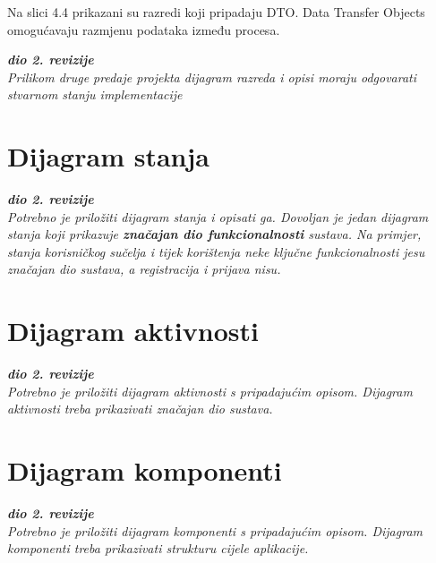 Na slici 4.4 prikazani su razredi koji pripadaju DTO. Data Transfer Objects omogućavaju
razmjenu podataka između procesa.


\textbf{\textit{dio 2. revizije}}\\

\textit{Prilikom druge predaje projekta dijagram razreda i opisi moraju odgovarati stvarnom stanju implementacije}



\eject

\section{Dijagram stanja}


\textbf{\textit{dio 2. revizije}}\\

\textit{Potrebno je priložiti dijagram stanja i opisati ga. Dovoljan je jedan dijagram stanja koji prikazuje \textbf{značajan dio funkcionalnosti} sustava. Na primjer, stanja korisničkog sučelja i tijek korištenja neke ključne funkcionalnosti jesu značajan dio sustava, a registracija i prijava nisu. }


\eject

\section{Dijagram aktivnosti}

\textbf{\textit{dio 2. revizije}}\\

\textit{Potrebno je priložiti dijagram aktivnosti s pripadajućim opisom. Dijagram aktivnosti treba prikazivati značajan dio sustava.}

\eject
\section{Dijagram komponenti}

\textbf{\textit{dio 2. revizije}}\\

\textit{Potrebno je priložiti dijagram komponenti s pripadajućim opisom. Dijagram komponenti treba prikazivati strukturu cijele aplikacije.}